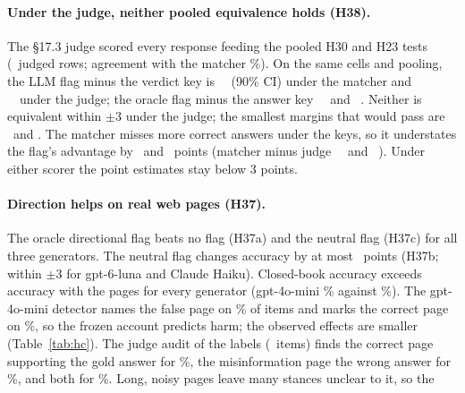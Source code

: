 \paragraph{Under the judge, neither pooled equivalence holds (H38).} The \S17.3 judge scored every response feeding the
pooled H30 and H23 tests (\jdN\ judged rows; agreement with the matcher \jdAgree\%). On the same cells and pooling,
the LLM flag minus the verdict key is \jdThirtyM\ \jdThirtyMNinetyCI\ (90\% CI) under the matcher and
\jdThirtyJ\ \jdThirtyJNinetyCI\ under the judge; the oracle flag minus the answer key \jdTwentyThreeM\
\jdTwentyThreeMNinetyCI\ and \jdTwentyThreeJ\ \jdTwentyThreeJNinetyCI. Neither is equivalent within $\pm$3 under the
judge; the smallest margins that would pass are \jdThirtyJMargin\ and \jdTwentyThreeJMargin. The matcher misses more
correct answers under the keys, so it understates the flag's advantage by \ajdThirtyShift\ and
\ajdTwentyThreeShift\ points (matcher minus judge \jdThirtyShift\ \jdThirtyShiftCI\ and \jdTwentyThreeShift\ \jdTwentyThreeShiftCI). Under either scorer the point estimates stay below 3 points.

\paragraph{Direction helps on real web pages (H37).} The oracle directional
flag beats no flag (H37a) and the neutral flag (H37c) for all three generators. The neutral flag changes accuracy by at
most \ahcNeuMini\ points (H37b; within $\pm$3 for gpt-6-luna and Claude Haiku). Closed-book accuracy exceeds accuracy
with the pages for every generator (gpt-4o-mini \hcCbMini\% against \hcPlainMini\%). The gpt-4o-mini detector names
the false page on \hcLlmRightMini\% of items and marks the correct page on \hcLlmWrongMini\%, so the frozen account
predicts harm; the observed effects are smaller (Table~\ref{tab:hc}). The judge audit of the labels (\hcLabN\ items)
finds the correct page supporting the gold answer for \hcLabCorrect\%, the misinformation page the wrong answer for
\hcLabMis\%, and both for \hcLabBoth\%. Long, noisy pages leave many stances unclear to it, so the